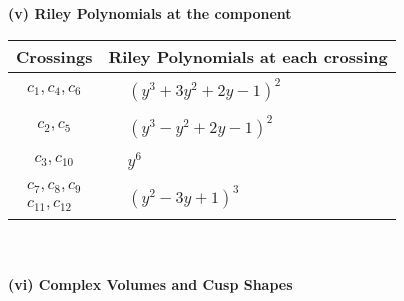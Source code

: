 \documentclass[1p]{elsarticle_modified}
\theoremstyle{definition}
\begin{document}
\newpage\renewcommand{\arraystretch}{1}
\flushleft \textbf{(v) Riley Polynomials at the component}\newline \\
\begin{tabular}{m{50pt}|m{274pt}}
Crossings & \hspace{64pt}Riley Polynomials at each crossing \\
\hline $$\begin{aligned}c_{1},c_{4},c_{6}\end{aligned}$$&$\begin{aligned}
&(y^3+3 y^2+2 y-1)^2
\end{aligned}$\\
\hline $$\begin{aligned}c_{2},c_{5}\end{aligned}$$&$\begin{aligned}
&(y^3- y^2+2 y-1)^2
\end{aligned}$\\
\hline $$\begin{aligned}c_{3},c_{10}\end{aligned}$$&$\begin{aligned}
&y^6
\end{aligned}$\\
\hline $$\begin{aligned}c_{7},c_{8},c_{9}\\c_{11},c_{12}\end{aligned}$$&$\begin{aligned}
&(y^2-3 y+1)^3
\end{aligned}$\\
\hline
\end{tabular}\\~\\
\newpage\flushleft \textbf{(vi) Complex Volumes and Cusp Shapes}
\end{document}
